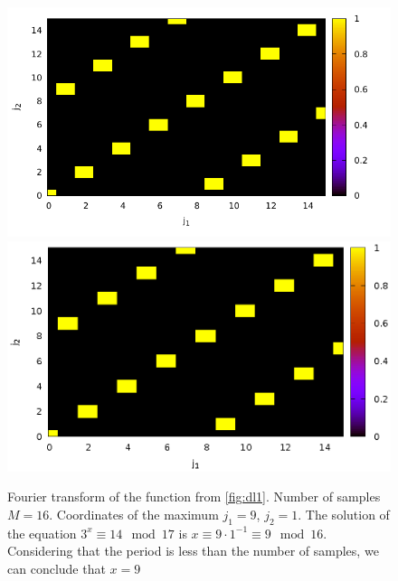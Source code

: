 \begin{figure}
\centering

\ifpdf
\includegraphics[angle=0]
{./discretlog/picdiscretlog2.pdf}
\else
\includegraphics[angle=0]
{./discretlog/picdiscretlog2.eps}
\fi

%

\caption{Fourier transform of the function from \autoref{fig:dl1}.
  Number of samples $M=16$. Coordinates of the maximum $j_1 = 9$, $j_2 = 1$. 
The solution of the equation $3^x \equiv 14 \mod 17$
is $x \equiv 9 \cdot 1^{-1} \equiv 9 \mod 16$. Considering that
the period is less than the number of samples, we can conclude that $x = 9$} 
\label{fig:dl2}
\end{figure}
